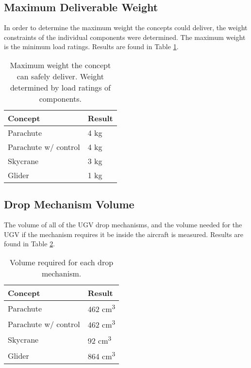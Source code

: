 \documentclass[]{auvsi_doc}
\begin{document}
	\subsection{Maximum Deliverable Weight}

	
	In order to determine the maximum weight the concepts could deliver, the weight constraints of the individual components were determined. The maximum weight is the minimum load ratings. Results are found in Table \ref{weight}.



	\begin{table}[!h]
\centering

\caption{Maximum weight the concept can safely deliver. Weight determined by load ratings of components.}
\label{weight}
	\begin{tabular}{|l|l|}
		\hline
		\textbf{Concept}       & \textbf{Result} \\
		\hline
		Parachute              &         4 kg        \\
		Parachute w/ control   &          4 kg       \\
		Skycrane               &        3 kg         \\
		Glider                 & 		1 kg	 \\
		\hline
	\end{tabular}
	\end{table}

	\subsection{Drop Mechanism Volume}

	The volume of all of the UGV drop mechanisms, and the volume needed for the UGV if the mechanism requires it be inside the aircraft is measured. Results are found in Table \ref{volume}.


	\begin{table}[!h]
\centering

\caption{Volume required for each drop mechanism.}
\label{volume}
	\begin{tabular}{|l|l|}
		\hline
		\textbf{Concept}       & \textbf{Result} \\
		\hline
		Parachute              &        462 cm\textsuperscript{3}         \\
		Parachute w/ control   &    462 cm\textsuperscript{3}             \\
		Skycrane               &          92 cm\textsuperscript{3}       \\
		Glider                 & 		864 cm\textsuperscript{3}	 \\
		\hline
	\end{tabular}
	\end{table}
\end{document}
